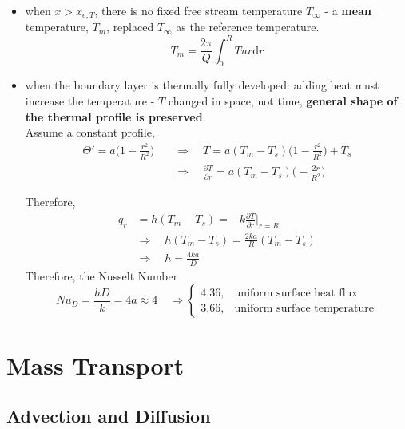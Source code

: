 \documentclass[12pt, a4paper]{article}
\begin{document}
\begin{itemize}
    \item when $x>x_{e,T}$, there is no fixed free stream temperature $T_\infty$ - a \textbf{mean} temperature, $T_m$, replaced $T_\infty$ as the reference temperature.
    \[
        T_m = \frac{2\pi}{Q} \int_{0}^{R} T u r \mathrm{d}r
    \]

    \item when the boundary layer is thermally fully developed: adding heat must increase the temperature - $T$ changed in space, not time, \textbf{general shape of the thermal profile is preserved}. \\ 
    
    Assume a constant profile,
    \begin{align*}
        \Theta' = a \bigg( 1 - \frac{r^2}{R^2} \bigg) \quad 
        & \Rightarrow \quad T = a (T_m - T_s) \bigg( 1 - \frac{r^2}{R^2} \bigg) + T_s \\
        & \Rightarrow \quad \frac{\partial T}{\partial r} = a (T_m - T_s) \bigg(- \frac{2r}{R^2} \bigg)
    \end{align*}
    
    Therefore,
    \begin{align*}
        q_r & =  h(T_m - T_s) = -k \frac{\partial T}{\partial r} \bigg\rvert_{r=R}\\
        & \Rightarrow \quad h(T_m - T_s) = \frac{2ka}{R} (T_m - T_s) \\
        & \Rightarrow \quad h = \frac{4ka}{D}
    \end{align*}
    Therefore, the Nusselt Number
    \[
        Nu_D = \frac{hD}{k} = 4a \approx 4 \quad \Rightarrow 
        \begin{cases}
            4.36, & \text{uniform surface heat flux}\\
            3.66, & \text{uniform surface temperature}
        \end{cases}
    \]
\end{itemize}


\newpage
\section{Mass Transport}
\subsection{Advection and Diffusion}
\end{document}
